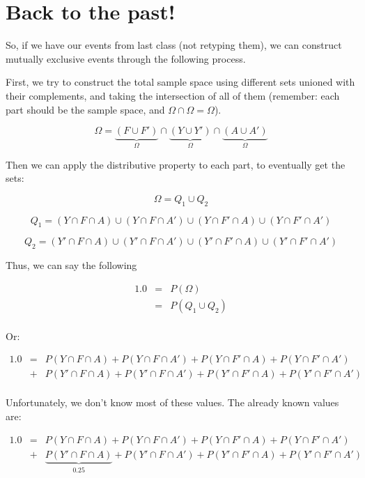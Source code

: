 \documentclass{article}
\begin{document}
\section*{Back to the past!}

So, if we have our events from last class (not retyping them), we can
construct mutually exclusive events through the following process.

First, we try to construct the total sample space using different sets
unioned with their complements, and taking the intersection of all of
them (remember: each part should be the sample space, and
$\Omega\cap\Omega=\Omega$).

\[
\Omega=
\underbrace{(F\cup F')}_{\Omega}
\cap
\underbrace{(Y\cup Y')}_{\Omega}
\cap
\underbrace{(A\cup A')}_{\Omega}
\]

Then we can apply the distributive property to each part, to
eventually get the sets:

\[
\Omega = Q_1 \cup Q_2
\]

\[
Q_1 = (Y\cap F\cap A)\cup(Y\cap F\cap A')\cup(Y\cap F'\cap A)\cup(Y\cap F'\cap A')
\]

\[
Q_2 = (Y'\cap F\cap A)\cup(Y'\cap F\cap A')\cup(Y'\cap F'\cap A)\cup(Y'\cap F'\cap A')
\]

Thus, we can say the following

\[
\begin{array}{rcl}
1.0 & = & P(\Omega) \\
    & = & P(Q_1\cup Q_2) \\
\end{array}
\]

Or:

\[
\begin{array}{rcl}
1.0 & = &
P(Y\cap F\cap A) +
P(Y\cap F\cap A') +
P(Y\cap F'\cap A) +
P(Y\cap F'\cap A') \\
    & + &
P(Y'\cap F\cap A) +
P(Y'\cap F\cap A') +
P(Y'\cap F'\cap A) +
P(Y'\cap F'\cap A') \\
\end{array}
\]

Unfortunately, we don't know most of these values. The already known
values are:

\[
\begin{array}{rcl}
1.0 & = &
P(Y\cap F\cap A) +
P(Y\cap F\cap A') +
P(Y\cap F'\cap A) +
P(Y\cap F'\cap A') \\
    & + &
\underbrace{P(Y'\cap F\cap A)}_{0.25} +
P(Y'\cap F\cap A') +
P(Y'\cap F'\cap A) +
P(Y'\cap F'\cap A') \\
\end{array}
\]
\end{document}
